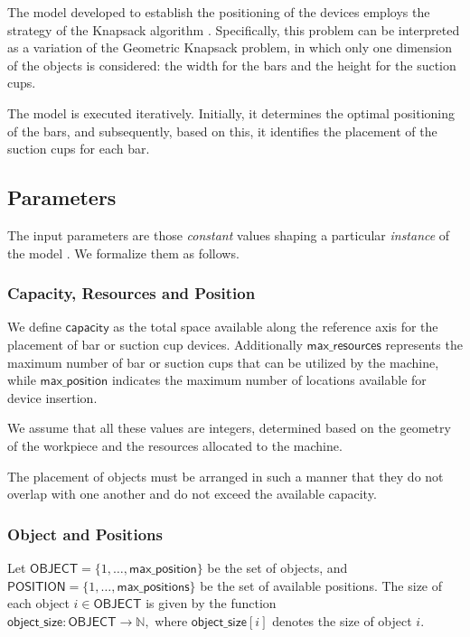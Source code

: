 \documentclass[runningheads]{llncs}
\begin{document}
The model developed to establish the positioning of the devices employs the strategy of the Knapsack algorithm
\cite{kellerer2004multidimensional}. Specifically, this problem can be interpreted as a variation of the Geometric Knapsack problem, in which only one dimension of the objects is considered: the width for the bars and the height for the suction cups.

The model is executed iteratively. Initially, it determines the optimal positioning of the bars, and subsequently, based on this, it identifies the placement of the suction cups for each bar.

\subsection{Parameters}
The input parameters are those \textit{constant} values shaping a particular \textit{instance} of the model \cite{wallace2020building}. We formalize them as follows.

\subsubsection{Capacity, Resources and Position}
We define \(\mathsf{capacity}\) as the total space available along the reference axis for the placement of bar or suction cup devices. Additionally \(\mathsf{max\_resources}\) represents the maximum number of bar or suction cups that can be utilized by the machine, while \(\mathsf{max\_position}\) indicates the maximum number of locations available for device insertion. 

We assume that all these values are integers, determined based on the geometry of the workpiece and the resources allocated to the machine. 

The placement of objects must be arranged in such a manner that they do not overlap with one another and do not exceed the available capacity.


\subsubsection{Object and Positions}
Let \(\mathsf{OBJECT} = \{1, \dots,  \mathsf{max\_position}\}\) be the set of objects, and \(\mathsf{POSITION} = \{1, \dots, \mathsf{max\_positions}\}\) be the set of available positions. The size of each object \(i \in \mathsf{OBJECT}\) is given by the function \\\(\mathsf{object\_size} \colon \mathsf{OBJECT} \to \mathbb{N},\) where \(\mathsf{object\_size}[i]\) denotes the size of object \(i\). 
\end{document}
